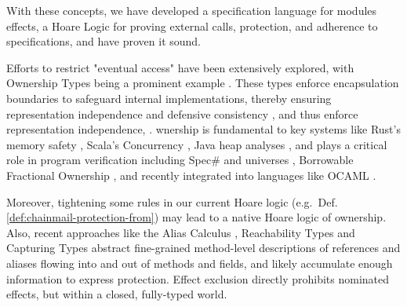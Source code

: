  With these concepts, we have developed a specification language for modules \taming effects, a Hoare Logic for proving external calls, protection, and adherence to specifications, and have proven it sound. %

   Efforts to restrict "eventual access" have been extensively explored, with
 Ownership Types  being a prominent example \cite{simpleOwnership,existOwn}.
These types enforce encapsulation boundaries to safeguard internal implementations, thereby ensuring representation independence and defensive consistency
\cite{ownalias,NobPotVitECOOP98}, and thus 
enforce representation independence,  %
\cite{Banerjee:2005}.
wnership is fundamental to key systems like Rust’s memory safety  
\cite{RustPL2,RustBelt18},
Scala's Concurrency \cite{ScalaCapabilities,ScalaLightweightAffine},
Java heap analyses \cite{PotterNC98,HillNP02,MitECOOP06}, 
and   plays a critical role in program verification
\cite{BoyLisShrPOPL03,hypervisor} including Spec$\#$
\cite{BarLeiSch05,BarDelFahLeiSch04} and universes
\cite{DieDroMue07,DietlMueller05,LuPotPOPL06},
Borrowable Fractional Ownership \cite{borrow-fract-vmcai2024},
and recently integrated into languages like OCAML \cite{ocaml-ownership-icfp2024,funk-ownership-oopsla2024}.


Moreover,  tightening some
rules in our current Hoare logic (e.g.\ Def. \ref{def:chainmail-protection-from})
may lead to a native  Hoare logic of ownership.
Also, recent approaches like
%
%
the Alias
Calculus \cite{meyer-alias-calculus-scp2015,meyer-auto-alias-sncs2020},
Reachability
Types \cite{romf-reachability-types-oopsla2021,rompf-poly-reachability-oopsla2024}
and Capturing
Types \cite{odersky-capturing-types-toplas2023,scoped-effects-oopsla2022,odersky-reach-prog2024}
abstract fine-grained method-level descriptions of 
references and aliases flowing into and out of methods and fields,
and likely accumulate enough information to express 
protection. Effect exclusion
\cite{fx-exclusion-icfp2023} directly prohibits nominated
effects, but within a closed, fully-typed world.



